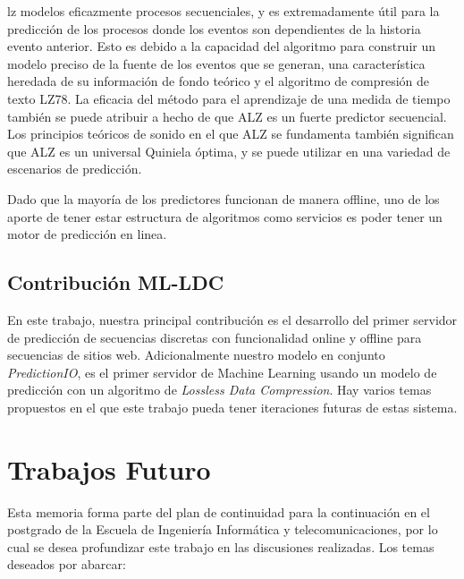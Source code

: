 lz modelos eficazmente procesos secuenciales, y es extremadamente útil para la predicción de los procesos donde los eventos son dependientes de la historia evento anterior. Esto es debido a la capacidad del algoritmo para construir un modelo preciso de la fuente de los eventos que se generan, una característica heredada de su información de fondo teórico y el algoritmo de compresión de texto LZ78.
%
La eficacia del método para el aprendizaje de una medida de tiempo también se puede atribuir a hecho de que ALZ es un fuerte predictor secuencial. Los principios teóricos de sonido en el que ALZ se fundamenta también significan que ALZ es un universal Quiniela óptima, y se puede utilizar en una variedad de escenarios de predicción.
%

Dado que la mayoría de los predictores funcionan de 
manera offline, uno de los aporte de tener estar estructura de algoritmos como servicios es poder tener un motor de predicción en linea.

\subsection{Contribución ML-LDC}


En este trabajo,  nuestra principal contribución es el desarrollo del primer servidor de predicción de secuencias discretas con funcionalidad online y offline para secuencias de  sitios web. Adicionalmente nuestro modelo en conjunto \emph{PredictionIO}, es el primer servidor de Machine Learning usando un modelo de predicción con un algoritmo de \emph{Lossless Data Compression}. Hay varios temas propuestos en el que este trabajo pueda tener iteraciones  futuras de estas sistema. 







\section{Trabajos Futuro}

Esta memoria forma parte del plan de continuidad para la continuación en el postgrado de la Escuela de Ingeniería Informática y telecomunicaciones, por lo cual se desea profundizar este trabajo en las discusiones realizadas. Los temas deseados por abarcar:

